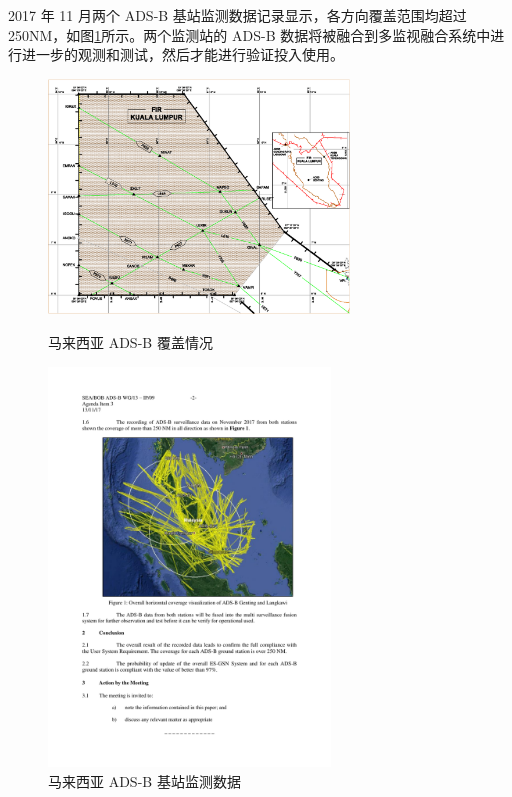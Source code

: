 2017 年 11 月两个 ADS-B 基站监测数据记录显示，各方向覆盖范围均超过 250NM，如图\ref{fig:Malaysia}所示。两个监测站的 ADS-B 数据将被融合到多监视融合系统中进行进一步的观测和测试，然后才能进行验证投入使用。

\begin{figure}[!htb]
\centering
\begin{minipage}[t]{0.50\textwidth}
\centering
\includegraphics[width=8cm]{pic/malaysia_cover.png}
\caption{马来西亚 ADS-B 覆盖情况\protect\footnotemark}
\label{fig:malaysia_cover}
\end{minipage}
\begin{minipage}[t]{0.48\textwidth}
\centering
\includegraphics[width=7.5cm]{pic/Malaysia.pdf}
\caption{马来西亚 ADS-B 基站监测数据\protect\footnotemark}
\label{fig:Malaysia}
\end{minipage}
\end{figure}

